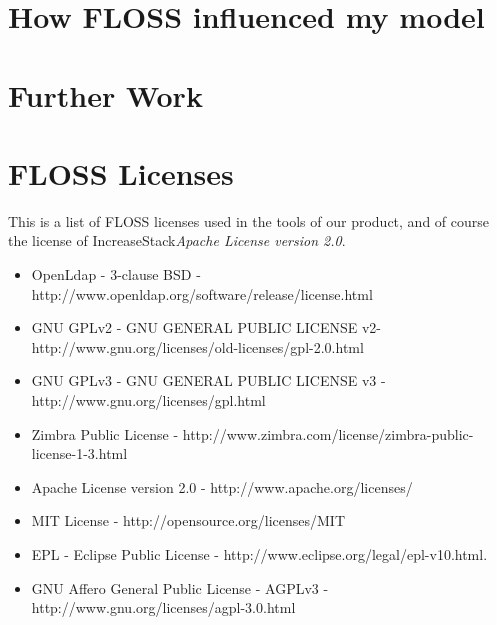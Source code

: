 \documentclass[11pt]{scrartcl}
\begin{document}
\section{How FLOSS influenced my model}


\section{Further Work}


\section{FLOSS Licenses}\label{lic:floss}

This is a list of FLOSS licenses used in the tools of our product, and of course the license of IncreaseStack\emph{Apache License version 2.0}.

\begin{itemize}
    \item OpenLdap - 3-clause BSD - http://www.openldap.org/software/release/license.html
    \item GNU GPLv2 - GNU GENERAL PUBLIC LICENSE v2- http://www.gnu.org/licenses/old-licenses/gpl-2.0.html
    \item GNU GPLv3 - GNU GENERAL PUBLIC LICENSE v3 - http://www.gnu.org/licenses/gpl.html
    \item Zimbra Public License - http://www.zimbra.com/license/zimbra-public-license-1-3.html
    \item Apache License version 2.0 - http://www.apache.org/licenses/
    \item MIT License - http://opensource.org/licenses/MIT
    \item EPL - Eclipse Public License - http://www.eclipse.org/legal/epl-v10.html.
    \item GNU Affero General Public License - AGPLv3 - http://www.gnu.org/licenses/agpl-3.0.html
\end{itemize}
\end{document}
